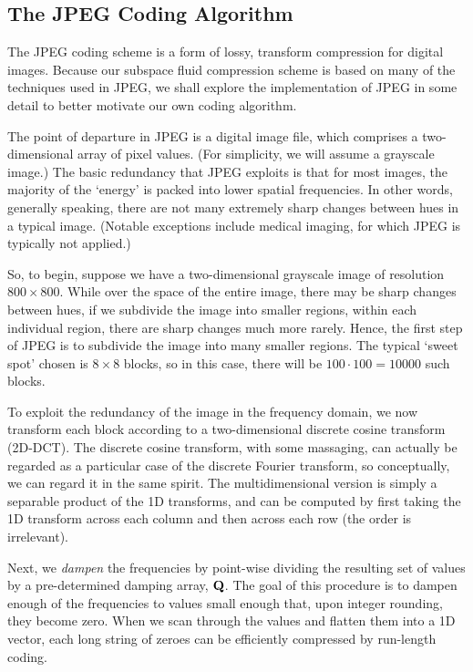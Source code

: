 \subsection{The JPEG Coding Algorithm}
The JPEG coding scheme is a form of lossy, transform compression for digital images. Because our subspace fluid compression scheme is based on many of the techniques used in JPEG, we shall explore the implementation of JPEG in some detail to better motivate our own coding algorithm. 

The point of departure in JPEG is a digital image file, which comprises a two-dimensional array of pixel values. (For simplicity, we will assume a grayscale image.) The basic redundancy that JPEG exploits is that for most images, the majority of the `energy' is packed into lower spatial frequencies. In other words, generally speaking, there are not many extremely sharp changes between hues in a typical image. (Notable exceptions include medical imaging, for which JPEG is typically not applied.) 

So, to begin, suppose we have a two-dimensional grayscale image of resolution $800 \times 800$. While over the space of the entire image, there may be sharp changes between hues, if we subdivide the image into smaller regions, within each individual region, there are sharp changes much more rarely. Hence, the first step of JPEG is to subdivide the image into many smaller regions. The typical `sweet spot' chosen is $8 \times 8$ blocks, so in this case, there will be $100 \cdot 100 = 10 000$ such blocks. 

To exploit the redundancy of the image in the frequency domain, we now transform each block according to a two-dimensional discrete cosine transform (2D-DCT). The discrete cosine transform, with some massaging, can actually be regarded as a particular case of the discrete Fourier transform, so conceptually, we can regard it in the same spirit. The multidimensional version is simply a separable product of the 1D transforms, and can be computed by first taking the 1D transform across each column and then across each row (the order is irrelevant).

Next, we {\em dampen} the frequencies by point-wise dividing the resulting set of values by a pre-determined damping array, $\mathbf{Q}$. The goal of this procedure is to dampen enough of the frequencies to values small enough that, upon integer rounding, they become zero. When we scan through the values and flatten them into a 1D vector, each long string of zeroes can be efficiently compressed by run-length coding.

